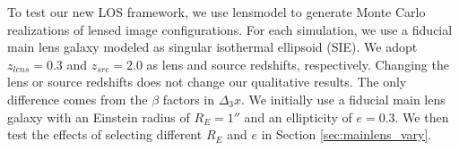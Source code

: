 To test our new LOS framework, we use lensmodel \citep{Keeton01} to generate Monte Carlo realizations of lensed image configurations. For each simulation, we use a fiducial main lens galaxy modeled as singular isothermal ellipsoid (SIE). We adopt $z_{lens} = 0.3$ and $z_{src} = 2.0$ as lens and source redshifts, respectively. Changing the lens or source redshifts does not change our qualitative results. The only difference comes from the $\beta$ factors in $\Delta_3 x$. We initially use a fiducial main lens galaxy with an Einstein radius of $R_E = 1''$ and an ellipticity of $e =0.3$. We then test the effects of selecting different $R_E$ and $e$ in Section \ref{sec:mainlens_vary}.